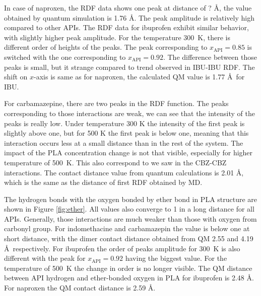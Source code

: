 In case of naproxen, the RDF data shows one peak at distance of ? \AA, the value obtained by quantum simulation is 1.76 \AA. The peak amplitude is relatively high compared to other APIs. The RDF data for ibuprofen exhibit similar behavior, with slightly higher peak amplitude. For the temperature 300~K, there is different order of heights of the peaks. The peak corresponding to $x_\text{API}=0.85$ is switched with the one corresponding to $x_\text{API}=0.92$. The difference between those peaks is small, but it strange compared to trend observed in IBU-IBU RDF. The shift on $x$-axis is same as for naproxen, the calculated QM value is 1.77 \AA~for IBU.

For carbamazepine, there are two peaks in the RDF function. The peaks corresponding to those interactions are weak, we can see that the intensity of the peaks is really low. Under temperature 300 K the intensity of the first peak is slightly above one, but for 500 K the first peak is below one, meaning that this interaction occurs less at a small distance than in the rest of the system. The impact of the PLA concentration change is not that visible, especially for higher temperature of 500~K. This also correspond to we saw in the CBZ-CBZ interactions. The contact distance value from quantum calculations is 2.01 \AA, which is the same as the distance of first RDF obtained by MD.


The hydrogen bonds with the oxygen bonded by ether bond in PLA structure are shown in Figure \ref{fig:ether}. All values also converge to 1 in a long distance for all APIs. Generally, those interactions are much weaker than those with oxygen from carbonyl group. For indomethacine and carbamazepin the value is below one at short distance, with the dimer contact distance obtained from QM 2.55 and 4.19 \AA~respectively. For ibuprofen the order of peaks amplitude for 300~K is also different with the peak for $x_\text{API}=0.92$ having the biggest value. For the temperature of 500~K the change in order is no longer visible. The QM distance between API hydrogen and ether-bonded oxygen in PLA for ibuprofen is 2.48 \AA. For naproxen the QM contact distance is 2.59 \AA. 



